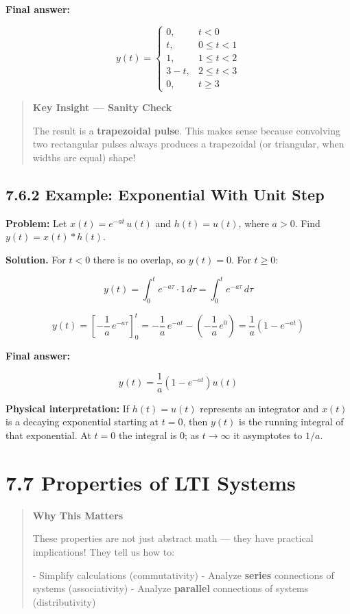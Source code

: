 \documentclass[11pt]{article}
\begin{document}
\textbf{Final answer:}

\[y(t) = \begin{cases} 0, & t < 0 \\ t, & 0 \leq t < 1 \\ 1, & 1 \leq t < 2 \\ 3-t, & 2 \leq t < 3 \\ 0, & t \geq 3 \end{cases}\]

\begin{quote}
\textbf{Key Insight — Sanity Check}

The result is a \textbf{trapezoidal pulse}. This makes sense because convolving two rectangular pulses always produces a trapezoidal (or triangular, when widths are equal) shape!
\end{quote}

\subsection*{7.6.2 Example: Exponential With Unit Step}

\textbf{Problem:} Let $x(t) = e^{-at}\,u(t)$ and $h(t) = u(t)$, where $a > 0$. Find $y(t) = x(t)*h(t)$.

\textbf{Solution.} For $t<0$ there is no overlap, so $y(t) = 0$. For $t \geq 0$:

\[y(t) = \int_0^t e^{-a\tau}\cdot 1\,d\tau = \int_0^t e^{-a\tau}\,d\tau\]

\[y(t) = \left[-\frac{1}{a}\,e^{-a\tau}\right]_0^t = -\frac{1}{a}\,e^{-at} - \left(-\frac{1}{a}\,e^0\right) = \frac{1}{a}\left(1 - e^{-at}\right)\]

\textbf{Final answer:}

\[\boxed{\;y(t) = \frac{1}{a}\left(1 - e^{-at}\right)u(t)\;}\]

\textbf{Physical interpretation:} If $h(t) = u(t)$ represents an integrator and $x(t)$ is a decaying exponential starting at $t=0$, then $y(t)$ is the running integral of that exponential. At $t=0$ the integral is 0; as $t\to\infty$ it asymptotes to $1/a$.

\section*{7.7 Properties of LTI Systems}

\begin{quote}
\textbf{Why This Matters}

These properties are not just abstract math — they have practical implications! They tell us how to:

- Simplify calculations (commutativity)
- Analyze \textbf{series} connections of systems (associativity)
- Analyze \textbf{parallel} connections of systems (distributivity)
\end{quote}
\end{document}
